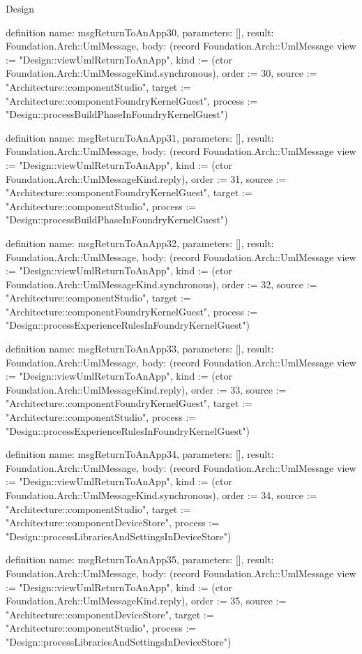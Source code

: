 \begin{lexlean}{Design}
\begin{semanticmodule}
definition{
  name: msgReturnToAnApp30,
  parameters: [],
  result: Foundation.Arch::UmlMessage,
  body: (record Foundation.Arch::UmlMessage {view := "Design::viewUmlReturnToAnApp", kind := (ctor Foundation.Arch::UmlMessageKind.synchronous), order := 30, source := "Architecture::componentStudio", target := "Architecture::componentFoundryKernelGuest", process := "Design::processBuildPhaseInFoundryKernelGuest"})
}

definition{
  name: msgReturnToAnApp31,
  parameters: [],
  result: Foundation.Arch::UmlMessage,
  body: (record Foundation.Arch::UmlMessage {view := "Design::viewUmlReturnToAnApp", kind := (ctor Foundation.Arch::UmlMessageKind.reply), order := 31, source := "Architecture::componentFoundryKernelGuest", target := "Architecture::componentStudio", process := "Design::processBuildPhaseInFoundryKernelGuest"})
}

definition{
  name: msgReturnToAnApp32,
  parameters: [],
  result: Foundation.Arch::UmlMessage,
  body: (record Foundation.Arch::UmlMessage {view := "Design::viewUmlReturnToAnApp", kind := (ctor Foundation.Arch::UmlMessageKind.synchronous), order := 32, source := "Architecture::componentStudio", target := "Architecture::componentFoundryKernelGuest", process := "Design::processExperienceRulesInFoundryKernelGuest"})
}

definition{
  name: msgReturnToAnApp33,
  parameters: [],
  result: Foundation.Arch::UmlMessage,
  body: (record Foundation.Arch::UmlMessage {view := "Design::viewUmlReturnToAnApp", kind := (ctor Foundation.Arch::UmlMessageKind.reply), order := 33, source := "Architecture::componentFoundryKernelGuest", target := "Architecture::componentStudio", process := "Design::processExperienceRulesInFoundryKernelGuest"})
}

definition{
  name: msgReturnToAnApp34,
  parameters: [],
  result: Foundation.Arch::UmlMessage,
  body: (record Foundation.Arch::UmlMessage {view := "Design::viewUmlReturnToAnApp", kind := (ctor Foundation.Arch::UmlMessageKind.synchronous), order := 34, source := "Architecture::componentStudio", target := "Architecture::componentDeviceStore", process := "Design::processLibrariesAndSettingsInDeviceStore"})
}

definition{
  name: msgReturnToAnApp35,
  parameters: [],
  result: Foundation.Arch::UmlMessage,
  body: (record Foundation.Arch::UmlMessage {view := "Design::viewUmlReturnToAnApp", kind := (ctor Foundation.Arch::UmlMessageKind.reply), order := 35, source := "Architecture::componentDeviceStore", target := "Architecture::componentStudio", process := "Design::processLibrariesAndSettingsInDeviceStore"})
}


\end{semanticmodule}
\end{lexlean}
